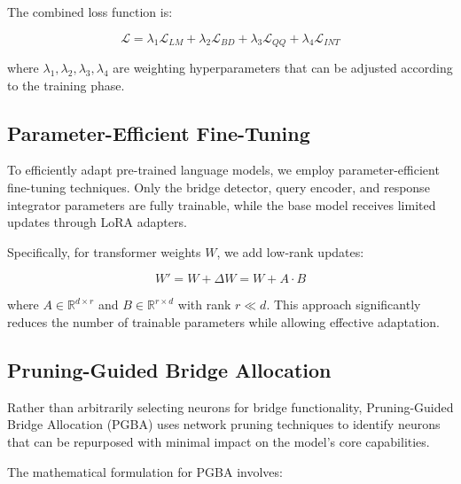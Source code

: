 \documentclass[9pt,a4paper,twocolumn,twoside]{tau-class/tau}
\begin{document}
    The combined loss function is:

    \begin{equation}
        \mathcal{L} = \lambda_1 \mathcal{L}_{LM} + \lambda_2 \mathcal{L}_{BD} + \lambda_3 \mathcal{L}_{QQ} + \lambda_4 \mathcal{L}_{INT}
    \end{equation}

    where $\lambda_1, \lambda_2, \lambda_3, \lambda_4$ are weighting hyperparameters that can be adjusted according to the training phase.

\subsection{Parameter-Efficient Fine-Tuning}

    To efficiently adapt pre-trained language models, we employ parameter-efficient fine-tuning techniques. Only the bridge detector, query encoder, and response integrator parameters are fully trainable, while the base model receives limited updates through LoRA adapters.

    Specifically, for transformer weights $W$, we add low-rank updates:

    \begin{equation}
        W' = W + \Delta W = W + A \cdot B
    \end{equation}

    where $A \in \mathbb{R}^{d \times r}$ and $B \in \mathbb{R}^{r \times d}$ with rank $r \ll d$. This approach significantly reduces the number of trainable parameters while allowing effective adaptation.

\subsection{Pruning-Guided Bridge Allocation}

    Rather than arbitrarily selecting neurons for bridge functionality, Pruning-Guided Bridge Allocation (PGBA) uses network pruning techniques to identify neurons that can be repurposed with minimal impact on the model's core capabilities.

    The mathematical formulation for PGBA involves:
\end{document}
